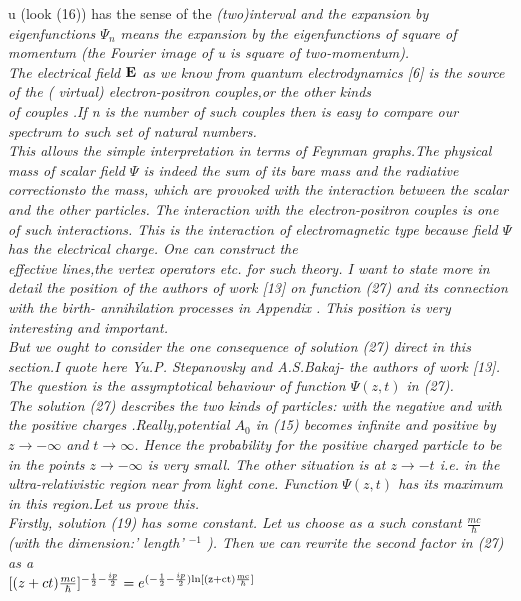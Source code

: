 \documentclass[a4paper,12pt] {article}
\begin{document}
{u (look (16)) has the sense of the \it (two)interval \rm  and the expansion by eigenfunctions $\Psi_n$
means the expansion
 by the   \it  eigenfunctions of square of momentum \rm  (the Fourier image of u  is  square of
 two-momentum).\\ The electrical field $ \bf  E$ \rm  as we know from quantum electrodynamics [6]  is
 the \it source of the ( virtual) electron-positron couples,or the other kinds \\
 of couples .\rm If n is the
 number of such couples then \it is easy to compare  our spectrum  to  such set of
 natural numbers.\\ \rm This allows the simple interpretation in terms of Feynman graphs.The physical
 mass of scalar field $\Psi $ is indeed the  sum of \it its  bare  mass \rm and the \it radiative corrections\rm to the mass,
 which are provoked \it with the  interaction  between the scalar and  the other particles. \rm The
interaction  with the  electron-positron couples is one of such interactions. This is the interaction of
\it electromagnetic type \rm  because field $\Psi $ has the electrical charge. One can construct the\\
effective lines,the vertex operators etc. for such theory. I want to state more in detail the position of the authors
 of work  [13] on function (27) and its connection with  the  birth- annihilation processes in Appendix  . This  position  is very interesting and
important.
\\ But  we ought to consider the one consequence of solution (27)  direct in this section.I quote here
 Yu.P. Stepanovsky and A.S.Bakaj- the authors of work [13]. The question is the
 \it assymptotical behaviour \rm  of  function  $ \Psi (z,t)$ in (27).\\
 The solution (27)  describes the two kinds of particles: with the negative and with the  positive
 charges .Really,potential $A_0$ in (15) becomes infinite and positive by  $ z\to -\infty $ and
 $ t\to \infty $. Hence the  probability for the positive charged  particle to be in the points
 $ z\to -\infty $ is very small. The other situation is at $ z \to -t $ i.e. in the  \it ultra-relativistic region \rm
  near from light cone. Function  $ \Psi (z,t)$  has its maximum in this region.Let us prove this.
\\ Firstly, solution  (19) has some constant. Let us choose as a such constant $\frac {mc}{\hbar}$
 (with the dimension:' length' $^{-1}$ ). Then we can rewrite the second factor in  (27) as a \\$ [(z+ct) \frac {mc}{\hbar}]^{-\frac {1}{2}-\frac {ip}{2} }= e^{(-\frac {1}{2}-\frac {ip}{2} )\rm ln[(z+ct) \frac{mc}{\hbar}]}$
}
\end{document}
